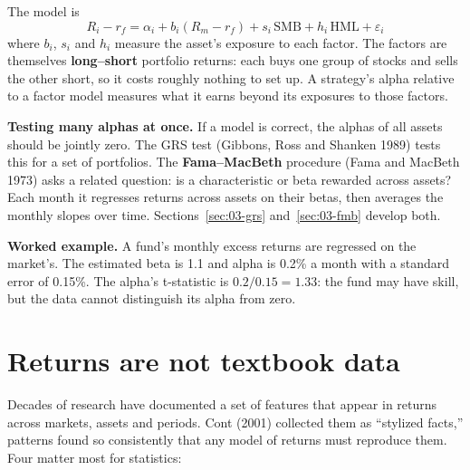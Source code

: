 The model is
\begin{equation}
  R_i - r_f = \alpha_i + b_i(R_m - r_f) + s_i\,\mathrm{SMB} + h_i\,\mathrm{HML} + \varepsilon_i
  \label{eq:03-ff3}
\end{equation}
where $b_i$, $s_i$ and $h_i$ measure the asset's exposure to each factor. The factors are themselves \textbf{long--short} portfolio returns: each buys one group of stocks and sells the other short, so it costs roughly nothing to set up. A strategy's alpha relative to a factor model measures what it earns beyond its exposures to those factors.

\textbf{Testing many alphas at once.} If a model is correct, the alphas of all assets should be jointly zero. The GRS test (Gibbons, Ross and Shanken 1989) tests this for a set of portfolios. The \textbf{Fama--MacBeth} procedure (Fama and MacBeth 1973) asks a related question: is a characteristic or beta rewarded across assets? Each month it regresses returns across assets on their betas, then averages the monthly slopes over time. Sections~\ref{sec:03-grs} and~\ref{sec:03-fmb} develop both.

\textbf{Worked example.} A fund's monthly excess returns are regressed on the market's. The estimated beta is 1.1 and alpha is 0.2\% a month with a standard error of 0.15\%. The alpha's t-statistic is $0.2/0.15 = 1.33$: the fund may have skill, but the data cannot distinguish its alpha from zero.


\section{Returns are not textbook data}
\label{sec:03-facts}

Decades of research have documented a set of features that appear in returns across markets, assets and periods. Cont (2001) collected them as ``stylized facts,'' patterns found so consistently that any model of returns must reproduce them. Four matter most for statistics:

